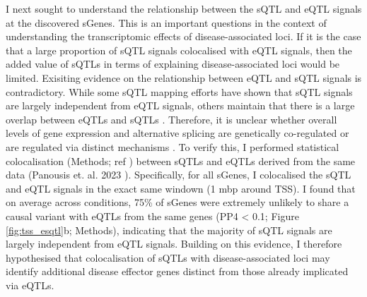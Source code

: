 I next sought to understand the relationship between the sQTL and eQTL signals at the discovered sGenes. This is an important questions in the context of understanding the transcriptomic effects of disease-associated loci. If it is the case that a large proportion of sQTL signals colocalised with eQTL signals, then the added value of sQTLs in terms of explaining disease-associated loci would be limited. Exisiting evidence on the relationship between eQTL and sQTL signals is contradictory. While some sQTL mapping efforts have shown that sQTL signals are largely independent from eQTL signals, others maintain that there is a large overlap between eQTLs and sQTLs \cite{Garrido-Martin2021-sk,Kim-Hellmuth2020-gz,Wang2008-fb,Lappalainen2013-mz}. Therefore, it is unclear whether overall levels of gene expression and alternative splicing are genetically co-regulated or are regulated via distinct mechanisms \cite{Kim-Hellmuth2020-gz,Wang2008-fb,Lappalainen2013-mz}. To verify this, I performed statistical colocalisation (Methods; ref \cite{Giambartolomei2014-yl}) between sQTLs and eQTLs derived from the same data (Panousis et. al. 2023 \cite{macromap-eqtl}). Specifically, for all sGenes, I colocalised the sQTL and eQTL signals in the exact same windown (1 mbp around TSS). I found that on average across conditions, 75\% of sGenes were extremely unlikely to share a causal variant with eQTLs from the same genes (PP4 < 0.1; Figure \ref{fig:tss_esqtl}b; Methods), indicating that the majority of sQTL signals are largely independent from eQTL signals. Building on this evidence, I therefore hypothesised that colocalisation of sQTLs with disease-associated loci may identify additional disease effector genes distinct from those already implicated via eQTLs. \\
